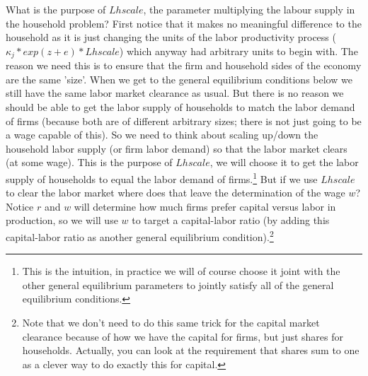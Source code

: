 What is the purpose of $Lhscale$, the parameter multiplying the labour supply in the household problem? First notice that it makes no meaningful difference to the household as it is just changing the units of the labor productivity process ($\kappa_{j}*exp(z+e)*Lhscale$) which anyway had arbitrary units to begin with. The reason we need this is to ensure that the firm and household sides of the economy are the same 'size'. When we get to the general equilibrium conditions below we still have the same labor market clearance as usual. But there is no reason we should be able to get the labor supply of households to match the labor demand of firms (because both are of different arbitrary sizes; there is not just going to be a wage capable of this). So we need to think about scaling up/down the household labor supply (or firm labor demand) so that the labor market clears (at some wage). This is the purpose of $Lhscale$, we will choose it to get the labor supply of households to equal the labor demand of firms.\footnote{This is the intuition, in practice we will of course choose it joint with the other general equilibrium parameters to jointly satisfy all of the general equilibrium conditions.} But if we use $Lhscale$ to clear the labor market where does that leave the determination of the wage $w$? Notice $r$ and $w$ will determine how much firms prefer capital versus labor in production, so we will use $w$ to target a capital-labor ratio (by adding this capital-labor ratio as another general equilibrium condition).\footnote{Note that we don't need to do this same trick for the capital market clearance because of how we have the capital for firms, but just shares for households. Actually, you can look at the requirement that shares sum to one as a clever way to do exactly this for capital.}

